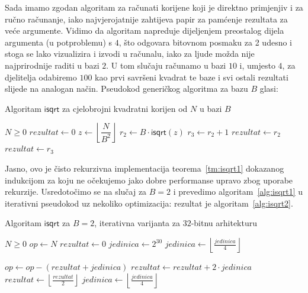 \documentclass[12pt]{scrartcl}
\begin{document}
Sada imamo zgodan algoritam za računati korijene koji je direktno primjenjiv i za ručno računanje, iako najvjerojatnije zahtijeva papir
za pamćenje rezultata za veće argumente. Vidimo da algoritam napreduje dijeljenjem preostalog dijela argumenta (u potproblemu) s $4$, što
odgovara bitovnom posmaku za 2 udesno i stoga se lako vizualizira i izvodi u računalu, iako za ljude možda nije najprirodnije raditi u bazi $2$.
U tom slučaju računamo u bazi $10$ i, umjesto $4$, za djelitelja odabiremo $100$ kao prvi savršeni kvadrat te baze i svi ostali rezultati slijede
na analogan način. Pseudokod generičkog algoritma za bazu $B$ glasi:
\begin{algorithm}
    \caption{Algoritam $\mathsf{isqrt}$ za cjelobrojni kvadratni korijen od $N$ u bazi $B$}\label{alg:isqrt1}
    \begin{algorithmic}
    \Require $N \geq 0$
        \State $rezultat \gets 0$
    \Else
        \State $z \gets \left\lfloor\dfrac{N}{B^2}\right\rfloor$
        \State $r_2 \gets B \cdot \mathsf{isqrt}(z)$
        \State $r_3 \gets r_2 + 1$
            \State $rezultat \gets r_2$
        \Else
            \State $rezultat \gets r_3$
        \EndIf
    \EndIf
    \end{algorithmic}
\end{algorithm}

Jasno, ovo je čisto rekurzivna implementacija teorema~\ref{tm:isqrt1} dokazanog indukcijom za koju ne očekujemo jako dobre performanse upravo zbog
uporabe rekurzije. Usredotočimo se na slučaj za $B=2$ i prevedimo algoritam~\ref{alg:isqrt1} u iterativni pseudokod uz nekoliko optimizacija: rezultat
je algoritam~\ref{alg:isqrt2}.
\begin{algorithm}
    \caption{Algoritam $\mathsf{isqrt}$ za $B=2$, iterativna varijanta za $32$-bitnu arhitekturu~\cite{guysqrt}}\label{alg:isqrt2}
    \begin{algorithmic}[1]
    \Require $N \geq 0$
    \State $op \gets N$
    \State $rezultat \gets 0$
    \State $jedinica \gets 2^{30}$
        \State $jedinica \gets \left\lfloor\frac{jedinica}{4}\right\rfloor$
    \EndWhile

            \State $op \gets op - (rezultat + jedinica)$
            \State $rezultat \gets rezultat + 2 \cdot jedinica$\label{line:rezupd}
        \EndIf
        \State $rezultat \gets \left\lfloor\frac{rezultat}{2}\right\rfloor$
        \State $jedinica \gets \left\lfloor\frac{jedinica}{4}\right\rfloor$
    \EndWhile
    \end{algorithmic}
\end{algorithm}
\end{document}
